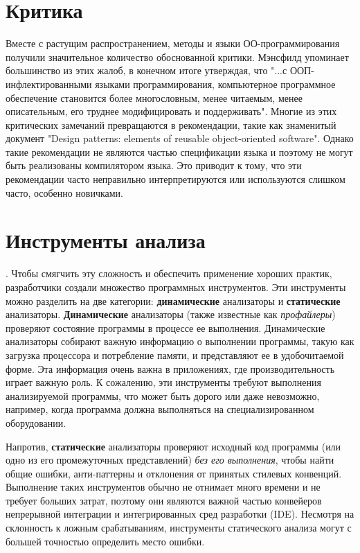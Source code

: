 \section{Критика}

Вместе с растущим распространением, методы и языки ОО-программирования получили значительное количество обоснованной критики. Мэнсфилд \cite{oopfailed} упоминает большинство из этих жалоб, в конечном итоге утверждая, что "...с ООП-инфлектированными языками программирования, компьютерное программное обеспечение становится более
многословным, менее читаемым, менее описательным, его труднее модифицировать и поддерживать". Многие из этих критических замечаний превращаются в рекомендации, такие как знаменитый документ "Design patterns: elements of reusable object-oriented software"\cite{GOFPatterns}. Однако такие рекомендации не являются частью спецификации языка и поэтому не могут быть реализованы компилятором языка. Это приводит к тому, что эти рекомендации часто неправильно интерпретируются или используются слишком часто, особенно новичками.

\section{Инструменты анализа}.
Чтобы смягчить эту сложность и обеспечить применение хороших практик, разработчики создали множество программных инструментов. Эти инструменты можно разделить на две категории: \textbf{динамические} анализаторы и \textbf{статические} анализаторы.
\textbf{Динамические} анализаторы (также известные как \textit{профайлеры}) проверяют состояние программы в процессе ее выполнения. Динамические анализаторы собирают важную информацию о выполнении программы, такую как загрузка процессора и потребление памяти, и представляют ее в удобочитаемой форме. Эта информация очень важна в приложениях, где производительность играет важную роль. К сожалению, эти инструменты требуют выполнения анализируемой программы, что может быть дорого или даже невозможно, например, когда программа должна выполняться на специализированном оборудовании.

Напротив, \textbf{статические} анализаторы проверяют исходный код программы (или одно из его промежуточных представлений) \textit{без его выполнения}, чтобы найти общие ошибки, анти-паттерны и отклонения от принятых стилевых конвенций. Выполнение таких инструментов обычно не отнимает много времени и не требует больших затрат, поэтому они являются важной частью конвейеров непрерывной интеграции \cite{ci} и интегрированных сред разработки (IDE).
Несмотря на склонность к ложным срабатываниям, инструменты статического анализа могут с большей точностью определить место ошибки.

